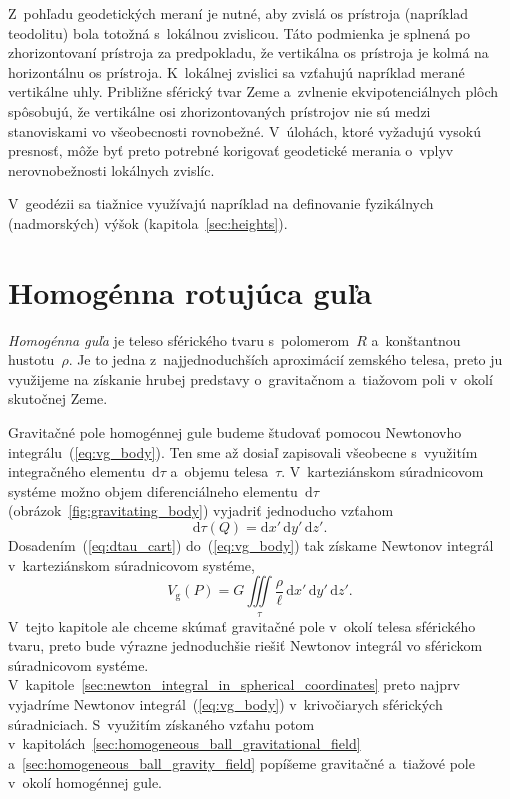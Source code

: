 \documentclass[a4paper, 12pt]{book}
\newcommand{\diff}{\mathrm d}
\newcommand{\gidx}{\mathrm g}
\begin{document}
Z~pohľadu geodetických meraní je nutné, aby zvislá os prístroja (napríklad 
teodolitu) bola totožná s~lokálnou zvislicou.  Táto podmienka je splnená po 
zhorizontovaní prístroja za predpokladu, že vertikálna os prístroja je kolmá na 
horizontálnu os prístroja.  K~lokálnej zvislici sa vzťahujú napríklad merané 
vertikálne uhly.  Približne sférický tvar Zeme a~zvlnenie ekvipotenciálnych 
plôch spôsobujú, že vertikálne osi zhorizontovaných prístrojov nie sú medzi 
stanoviskami vo všeobecnosti rovnobežné.  V~úlohách, ktoré vyžadujú vysokú 
presnosť, môže byť preto potrebné korigovať geodetické merania o~vplyv 
nerovnobežnosti lokálnych zvislíc.

V~geodézii sa tiažnice využívajú napríklad na definovanie fyzikálnych 
(nadmorských) výšok (kapitola~\ref{sec:heights}).

\section{Homogénna rotujúca guľa}
\label{sec:homogeneous_ball}

\emph{Homogénna guľa} je teleso sférického tvaru s~polomerom~$R$ a~konštantnou 
hustotu~$\rho$.  Je to jedna z~najjednoduchších aproximácií zemského telesa, 
preto ju využijeme na získanie hrubej predstavy o~gravitačnom a~tiažovom poli 
v~okolí skutočnej Zeme.

Gravitačné pole homogénnej gule budeme študovať pomocou Newtonovho 
integrálu~(\ref{eq:vg_body}).  Ten sme až dosiaľ zapisovali všeobecne 
s~využitím integračného elementu~$\diff \tau$ a~objemu telesa~$\tau$.  
V~karteziánskom súradnicovom systéme možno objem diferenciálneho 
elementu~$\diff \tau$ (obrázok~\ref{fig:gravitating_body}) vyjadriť jednoducho 
vzťahom
%
\begin{equation}
\label{eq:dtau_cart}
\diff \tau(Q) = \diff x' \, \diff y' \, \diff z'{.}
\end{equation}
%
Dosadením~(\ref{eq:dtau_cart}) do~(\ref{eq:vg_body}) tak získame Newtonov 
integrál v~karteziánskom súradnicovom systéme,
%
\begin{equation}
\label{eq:vg_body_cart}
V_\gidx(P) = G \iiint\limits_{\tau} \frac{\rho}{\ell} \, \diff x' \, \diff y' 
\, \diff z'{.}
\end{equation}
%
V~tejto kapitole ale chceme skúmať gravitačné pole v~okolí telesa sférického 
tvaru, preto bude výrazne jednoduchšie riešiť Newtonov integrál vo sférickom 
súradnicovom systéme.  
V~kapitole~\ref{sec:newton_integral_in_spherical_coordinates} preto najprv 
vyjadríme Newtonov integrál~(\ref{eq:vg_body}) v~krivočiarych sférických 
súradniciach.  S~využitím získaného vzťahu potom 
v~kapitolách~\ref{sec:homogeneous_ball_gravitational_field} 
a~\ref{sec:homogeneous_ball_gravity_field} popíšeme gravitačné a~tiažové pole 
v~okolí homogénnej gule.
\end{document}
